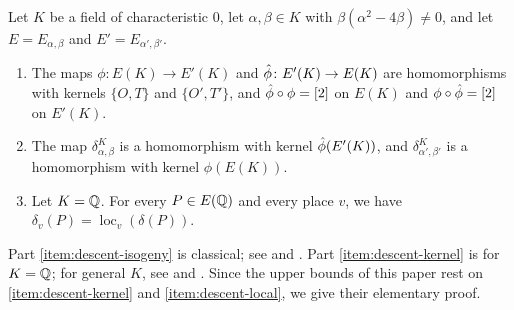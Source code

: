 \begin{proposition}\label{prop:descent}
Let $K$ be a field of characteristic $0$, let $\alpha,\beta\in K$ with $\beta(\alpha^2-4\beta)\ne0$, and let $E=E_{\alpha,\beta}$ and $E'=E_{\alpha',\beta'}$.
\begin{enumerate}[label=(\alph*),ref=(\alph*)]
\item\label{item:descent-isogeny} The maps $\phi\colon E(K)\to E'(K)$ and $\hat\phi\colon E'(K)\to E(K)$ are homomorphisms with kernels $\{O,T\}$ and $\{O',T'\}$, and $\hat\phi\circ\phi=[2]$ on $E(K)$ and $\phi\circ\hat\phi=[2]$ on $E'(K)$.
\item\label{item:descent-kernel} The map $\delta^K_{\alpha,\beta}$ is a homomorphism with kernel $\hat\phi(E'(K))$, and $\delta^K_{\alpha',\beta'}$ is a homomorphism with kernel $\phi(E(K))$.
\item\label{item:descent-local} Let $K=\mathbb Q$. For every $P\in E(\mathbb Q)$ and every place $v$, we have $\delta_v(P)=\operatorname{loc}_v(\delta(P))$.
\end{enumerate}
\end{proposition}

Part \ref{item:descent-isogeny} is classical; see \cite[Section~3.4]{SilvermanTate2015} and \cite[Example~III.4.5 and Theorem~III.4.8]{SilvermanAEC}. Part \ref{item:descent-kernel} is \cite[Proposition~3.8]{SilvermanTate2015} for $K=\mathbb Q$; for general $K$, see \cite[Example~X.4.8 and Proposition~X.4.9]{SilvermanAEC} and \cite[Section~3.1]{Zywina2026}. Since the upper bounds of this paper rest on \ref{item:descent-kernel} and \ref{item:descent-local}, we give their elementary proof.

